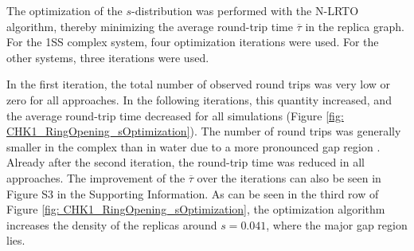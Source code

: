 \begin{table}[h]
\caption{Energy offsets $\vec{E^R}$ estimated from a short RE-EDS simulation using the PEOE \cite{Sidler2016} scheme. The errors indicate the standard deviation over the different replicas in undersampling. All energy offsets were calculated relative to ligand L1. The starting coordinates were selected following the 1SS or the SSM approach (see Theory and Methods sections).}
\label{tab:CHK1_set2_Eoff}
\end{table}

The optimization of the $s$-distribution was performed with the N-LRTO \cite{Sidler2017} algorithm, thereby minimizing the average round-trip time $\overline{\tau}$ in the replica graph. For the 1SS complex system, four optimization iterations were used. For the other systems, three iterations were used. 

%
In the first iteration, the total number of observed round trips was very low or zero for all approaches. In the following iterations, this quantity increased, and the average round-trip time decreased for all simulations (Figure \ref{fig: CHK1_RingOpening_sOptimization}). The number of round trips was generally smaller in the complex than in water due to a more pronounced gap region \cite{Sidler2017}.
Already after the second iteration, the round-trip time was reduced in all approaches. The improvement of the $\overline{\tau}$ over the iterations can also be seen in Figure S3 in the Supporting Information. %
As can be seen in the third row of Figure \ref{fig: CHK1_RingOpening_sOptimization}, the optimization algorithm increases the density of the replicas around $s = 0.041$, where the major gap region lies.

